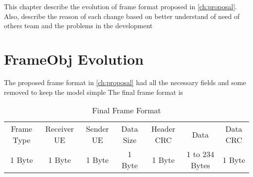 This chapter describe the evolution of frame format proposed in \ref{ch:proposal}. Also, describe the reason
 of each change based on better understand of need of others team and the problems in the development


\section{FrameObj Evolution}

The proposed frame format in \ref{ch:proposal} had all the necessary fields and some removed to keep the model simple
The final frame format is 

\begin{table}
\begin{tabular}{| c | c | c | c | c | c | c | }
  \hline                       
  Frame Type & Receiver UE & Sender UE & Data Size & Header CRC & Data & Data CRC\\
  1 Byte & 1 Byte & 1 Byte & 1 Byte & 1 Byte & 1 to 234 Bytes & 1 Byte\\
  
  \hline  
\end{tabular}
 \caption{Final Frame Format}
\end{table}